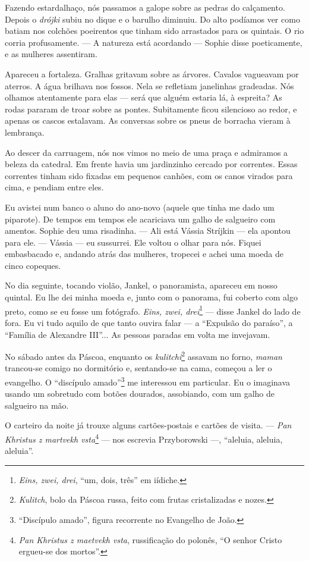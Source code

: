 Fazendo estardalhaço, nós passamos a galope sobre as pedras do
calçamento. Depois o \emph{drójki} subiu no dique e o barulho diminuiu.
Do alto podíamos ver como batiam nos colchões poeirentos que tinham sido
arrastados para os quintais. O rio corria profusamente. --- A natureza
está acordando --- Sophie disse poeticamente, e as mulheres assentiram.

Apareceu a fortaleza. Gralhas gritavam sobre as árvores. Cavalos
vagueavam por aterros. A água brilhava nos fossos. Nela se refletiam
janelinhas gradeadas. Nós olhamos atentamente para elas --- será que
alguém estaria lá, à espreita? As rodas pararam de troar sobre as
pontes. Subitamente ficou silencioso ao redor, e apenas os cascos
estalavam. As conversas sobre os pneus de borracha vieram à lembrança.

Ao descer da carruagem, nós nos vimos no meio de uma praça e admiramos a
beleza da catedral. Em frente havia um jardinzinho cercado por
correntes. Essas correntes tinham sido fixadas em pequenos canhões, com
os canos virados para cima, e pendiam entre eles.

Eu avistei num banco o aluno do ano-novo (aquele que tinha me dado um
piparote). De tempos em tempos ele acariciava um galho de salgueiro com
amentos. Sophie deu uma risadinha. --- Ali está Vássia Stríjkin --- ela
apontou para ele. --- Vássia --- eu sussurrei. Ele voltou o olhar para
nós. Fiquei embasbacado e, andando atrás das mulheres, tropecei e achei
uma moeda de cinco copeques.

No dia seguinte, tocando violão, Jankel, o panoramista, apareceu em
nosso quintal. Eu lhe dei minha moeda e, junto com o panorama, fui
coberto com algo preto, como se eu fosse um fotógrafo. \emph{Eins, zwei,
drei}\footnote{\emph{Eins, zwei, drei}, ``um, dois, três'' em iídiche.}
--- disse Jankel do lado de fora. Eu vi tudo aquilo de que tanto ouvira
falar --- a ``Expulsão do paraíso'', a ``Família de Alexandre III''...
As pessoas paradas em volta me invejavam.

No sábado antes da Páscoa, enquanto os \emph{kulitchi}\footnote{\emph{Kulitch},
  bolo da Páscoa russa, feito com frutas cristalizadas e nozes.} assavam
no forno, \emph{maman} trancou-se comigo no dormitório e, sentando-se na
cama, começou a ler o evangelho. O ``discípulo amado''\footnote{``Discípulo
  amado'', figura recorrente no Evangelho de João.} me interessou em
particular. Eu o imaginava usando um sobretudo com botões dourados,
assobiando, com um galho de salgueiro na mão.

O carteiro da noite já trouxe alguns cartões-postais e cartões de
visita. --- \emph{Pan Khristus z martvekh vsta}\footnote{\emph{Pan
  Khristus z maetvekh vsta}, russificação do polonês, ``O senhor Cristo
  ergueu-se dos mortos''.} --- nos escrevia Przyborowski ---, ``aleluia,
aleluia, aleluia''.

